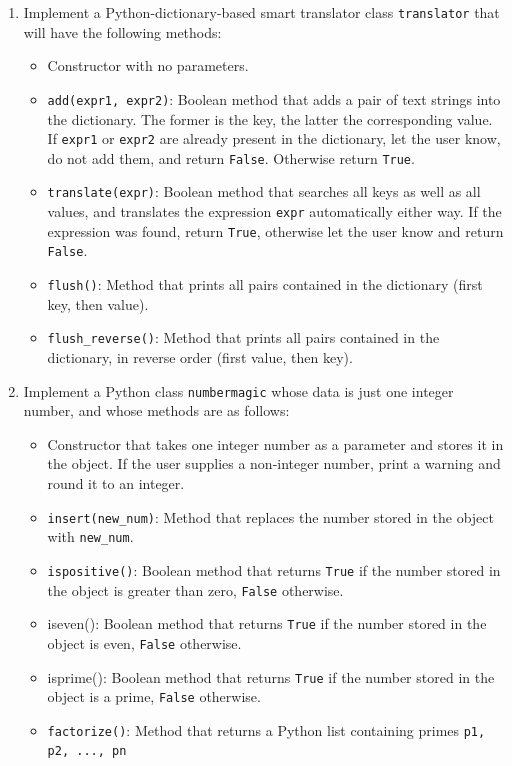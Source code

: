 \begin{enumerate}
\item Implement a Python-dictionary-based smart translator class {\tt translator} that 
      will have the following methods:
\begin{itemize}
\item Constructor with no parameters.
\item {\tt add(expr1, expr2)}: Boolean method that adds a pair of text strings into 
      the dictionary. The former is the key, the latter the corresponding value. 
      If {\tt expr1} or {\tt expr2} are already present in the dictionary,
      let the user know, do not add them, and return {\tt False}. Otherwise return {\tt True}.
\item {\tt translate(expr)}: Boolean method that searches all keys as well as all values,
      and translates the expression {\tt expr} automatically either way. If the expression 
      was found, return {\tt True}, otherwise let the user know and return {\tt False}.
\item {\tt flush()}: Method that prints all pairs contained in the dictionary (first key, then value).
\item {\tt flush\_reverse()}: Method that prints all pairs contained in the dictionary, in
      reverse order (first value, then key).
\end{itemize}
\item Implement a Python class {\tt numbermagic} whose data is just one integer number, and 
      whose methods are as follows:
\begin{itemize}
\item Constructor that takes one integer number as a parameter and stores it in the object. 
      If the user supplies a non-integer number, print a warning and round it to an integer. 
\item {\tt insert(new\_num)}: Method that replaces the number stored in the object with {\tt new\_num}.
\item {\tt ispositive()}: Boolean method that returns {\tt True} if the number stored in the object is 
      greater than zero, {\tt False} otherwise.
\item {iseven()}: Boolean method that returns {\tt True} if the number stored in the object is even,
      {\tt False} otherwise.
\item {isprime()}: Boolean method that returns {\tt True} if the number stored in the object is a prime,
      {\tt False} otherwise.
\item {\tt factorize()}: Method that returns a Python list containing primes {\tt p1, p2, ..., pn}

\end{itemize}
\end{enumerate}
